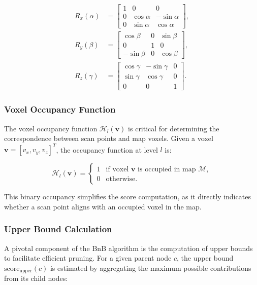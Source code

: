 \begin{align}
R_x(\alpha) &= \begin{bmatrix}
1 & 0 & 0 \\
0 & \cos\alpha & -\sin\alpha \\
0 & \sin\alpha & \cos\alpha
\end{bmatrix}, \\
R_y(\beta) &= \begin{bmatrix}
\cos\beta & 0 & \sin\beta \\
0 & 1 & 0 \\
-\sin\beta & 0 & \cos\beta
\end{bmatrix}, \\
R_z(\gamma) &= \begin{bmatrix}
\cos\gamma & -\sin\gamma & 0 \\
\sin\gamma & \cos\gamma & 0 \\
0 & 0 & 1
\end{bmatrix}.
\end{align}

\subsubsection{Voxel Occupancy Function}
The voxel occupancy function $\mathcal{H}_l(\mathbf{v})$ is critical for determining the correspondence between scan points and map voxels. Given a voxel $\mathbf{v} = [v_x, v_y, v_z]^T$, the occupancy function at level $l$ is:

\begin{equation*}
\mathcal{H}_l(\mathbf{v}) = 
\begin{cases}
1 & \text{if voxel } \mathbf{v} \text{ is occupied in map } \mathcal{M}, \\
0 & \text{otherwise}.
\end{cases}
\end{equation*}

This binary occupancy simplifies the score computation, as it directly indicates whether a scan point aligns with an occupied voxel in the map.

\subsubsection{Upper Bound Calculation}
A pivotal component of the BnB algorithm is the computation of upper bounds to facilitate efficient pruning. For a given parent node $c$, the upper bound $\text{score}_{\text{upper}}(c)$ is estimated by aggregating the maximum possible contributions from its child nodes:

